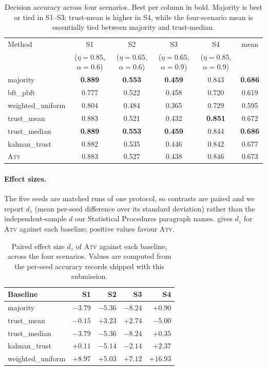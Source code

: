\documentclass[11pt]{article}
\begin{document}
\begin{table}[ht]
\caption{Decision accuracy across four scenarios. Best per column in bold.
Majority is best or tied in S1--S3; trust-mean is higher in S4, while the
four-scenario mean is essentially tied between majority and trust-median.}
\label{tab:main}
\centering
\small
\begin{tabular}{lccccc}
\toprule
Method & S1 & S2 & S3 & S4 & mean \\
 & ($\eta{=}0.85$, $\alpha{=}0.6$)
 & ($\eta{=}0.65$, $\alpha{=}0.6$)
 & ($\eta{=}0.65$, $\alpha{=}0.9$)
 & ($\eta{=}0.85$, $\alpha{=}0.9$)
 & \\
\midrule
majority            & \textbf{0.889} & \textbf{0.553} & \textbf{0.459} & 0.843 & \textbf{0.686} \\
bft\_pbft           & 0.777 & 0.522 & 0.458 & 0.720 & 0.619 \\
weighted\_uniform   & 0.804 & 0.484 & 0.365 & 0.729 & 0.595 \\
trust\_mean         & 0.883 & 0.521 & 0.432 & \textbf{0.851} & 0.672 \\
trust\_median       & \textbf{0.889} & \textbf{0.553} & \textbf{0.459} & 0.844 & \textbf{0.686} \\
kalman\_trust       & 0.882 & 0.535 & 0.446 & 0.842 & 0.677 \\
\textsc{Atv}        & 0.883 & 0.527 & 0.438 & 0.846 & 0.673 \\
\bottomrule
\end{tabular}
\end{table}

\paragraph{Effect sizes.}
The five seeds are matched runs of one protocol, so contrasts are paired and
we report $d_z$ (mean per-seed difference over its standard deviation) rather
than the independent-sample $d$ our Statistical Procedures paragraph names.
 gives $d_z$ for \textsc{Atv} against each baseline; positive
values favour \textsc{Atv}.

\begin{table}[ht]
\caption{Paired effect size $d_z$ of \textsc{Atv} against each baseline,
across the four scenarios. Values are computed from the per-seed accuracy
records shipped with this submission.}
\label{tab:dz}
\centering
\small
\begin{tabular}{lrrrr}
\toprule
Baseline & S1 & S2 & S3 & S4 \\
\midrule
majority         & $-3.79$ & $-5.36$ & $-8.24$ & $+0.90$ \\
trust\_mean      & $-0.15$ & $+3.23$ & $+2.74$ & $-5.00$ \\
trust\_median    & $-3.79$ & $-5.36$ & $-8.24$ & $+0.35$ \\
kalman\_trust    & $+0.11$ & $-5.14$ & $-2.14$ & $+2.37$ \\
weighted\_uniform & $+8.97$ & $+5.03$ & $+7.12$ & $+16.93$ \\
\bottomrule
\end{tabular}
\end{table}
\end{document}
